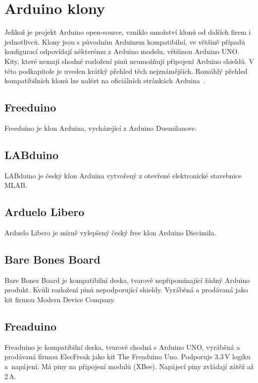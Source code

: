 \section{Arduino klony}
\label{KapArduinoKlony}

	Jelikož je projekt Arduino open-source, vzniklo množství klonů od dalších firem i jednotlivců. Klony jsou s původním Arduinem kompatibilní, ve většině případů konfigurací odpovídají některému z Arduino modelu, většinou Arduino UNO. Kity, které nemají shodné rozložení pinů neumožňují připojení Arduino shieldů. V této podkapitole je uveden krátký přehled těch nejznámějších. Rozsáhlý přehled kompatibilních klonů lze nalézt na oficiálních stránkách Arduina~\cite{ArduinoClonesWeb}.
	
	\subsection{Freeduino} 
	Freeduino je klon Arduina, vycházející z Arduino Duemilanove.
	
	\subsection{LABduino} 
	LABduino je český klon Arduina vytvořený z otevřené elektronické stavebnice MLAB.
	
	\subsection{Arduelo Libero}	
	Arduelo Libero je mírně vylepšený český free klon Arduino Diecimila.
	
	\subsection{Bare Bones Board} 
	Bare Bones Board je kompatibilní deska, tvarově nepřipomínající žádný Arduino produkt. Kvůli rozložení pinů nepodporující shieldy. Vyráběná a prodávaná jako kit firmou Modern Device Company.
	
	\subsection{Freaduino} 
	Freaduino je kompatibilní deska, tvarově shodná s Arduino UNO, vyráběná a prodávaná firmou ElecFreak jako kit The Freaduino Uno. Podporuje 3,3\,V logiku a~napájení. Má piny na připojení modulů (XBee). Napájecí piny zvládají zátěž až 2\,A.

